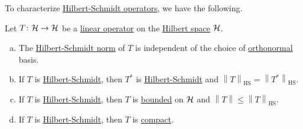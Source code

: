 To characterize \hyperref[def:Hilbert-Schmidt-op]{Hilbert-Schmidt operators}, we have the following.

\begin{proposition}
	Let \(T\colon \mathcal{\MakeUppercase{h}} \to \mathcal{\MakeUppercase{h}} \) be a \hyperref[def:linear-op]{linear operator} on the \hyperref[def:Hilbert-space]{Hilbert space} \(\mathcal{\MakeUppercase{h}} \).
	\begin{enumerate}[(a)]
		\item The \hyperref[def:Hilbert-Schmidt-norm]{Hilbert-Schmidt norm} of \(T\) is independent of the choice of \hyperref[def:orthonormal-system]{orthonormal} basis.
		\item If \(T\) is \hyperref[def:Hilbert-Schmidt-op]{Hilbert-Schmidt}, then \(T^{\ast} \) is \hyperref[def:Hilbert-Schmidt-op]{Hilbert-Schmidt} and \(\left\lVert T\right\rVert _{\mathrm{HS} } = \left\lVert T^{\ast} \right\rVert _{\mathrm{HS} } \).
		\item If \(T\) is \hyperref[def:Hilbert-Schmidt-op]{Hilbert-Schmidt}, then \(T\) is \hyperref[def:bounded-linear-op]{bounded} on \(\mathcal{\MakeUppercase{h}} \) and \(\left\lVert T\right\rVert \leq \left\lVert T\right\rVert _{\mathrm{HS} }\).
		\item If \(T\) is \hyperref[def:Hilbert-Schmidt-op]{Hilbert-Schmidt}, then \(T\) is \hyperref[def:compact-op]{compact}.
	\end{enumerate}
\end{proposition}
